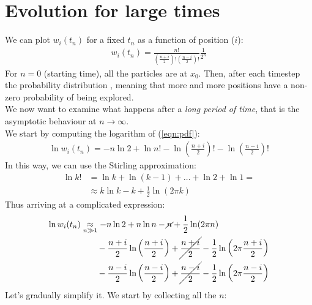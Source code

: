 \documentclass[../template.tex]{subfiles}
\begin{document}
\section{Evolution for large times}
We can plot $w_i(t_n)$ for a fixed $t_n$ as a function of position ($i$):
\begin{align}
    w_i(t_n) = \frac{n!}{\left(\frac{n+i}{2}\right)! \left(\frac{n-i}{2}\right)!} \frac{1}{2^n}
    \label{eqn:pdf}
\end{align}   
For $n=0$ (starting time), all the particles are at $x_0$. Then, after each timestep the probability distribution , meaning that more and more positions have a non-zero probability of being explored.\\
We now want to examine what happens after a \textit{long period of time}, that is the asymptotic behaviour at $n \to \infty$.\\
We start by computing the logarithm of (\ref{eqn:pdf}):
\begin{align*}
    \ln w_i(t_n) = -n \ln 2 + \ln n! - \ln \left(\frac{n+i}{2}\right)! - \ln \left(\frac{n-i}{2}\right)!
\end{align*}
In this way, we can use the Stirling approximation:
\begin{align*}
    \ln k! &= \ln k + \ln(k-1) + \dots + \ln 2 + \ln 1 = \\
    &\approx k\ln k - k  + \frac{1}{2} \ln(2\pi k) 
\end{align*}
Thus arriving at a complicated expression:
\begin{align*}
    \ln w_i(t_n) &\underset{n \gg 1}{\approx} -n \ln 2 +n\ln n - \cancel{n} + \frac{1}{2}\ln(2\pi n) \\
    &\hphantom{abcd} - \frac{n+i}{2} \ln \left(\frac{n+i}{2} \right) + \cancel{\frac{n+i}{2}} -\frac{1}{2}\ln\left(2 \pi \frac{n+i}{2} \right)  \\
    &\hphantom{abcd} -\frac{n-i}{2} \ln\left(\frac{n-i}{2} \right) +\cancel{\frac{n-i}{2}} - \frac{1}{2}\ln\left(2 \pi \frac{n-i}{2} \right)   
\end{align*}
Let's gradually simplify it. We start by collecting all the $n$:
\end{document}
